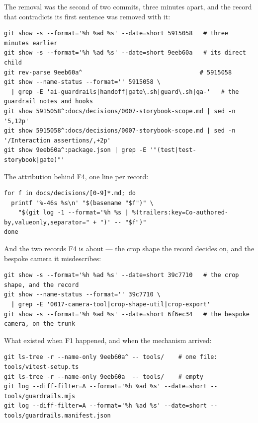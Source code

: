 \documentclass[11pt,a4paper]{article}
\begin{document}
The removal was the second of two commits, three minutes apart, and the record that contradicts its first sentence was removed with it:

\begin{Verbatim}[fontsize=\footnotesize,breaklines=true,breakanywhere=true]
git show -s --format='%h %ad %s' --date=short 5915058   # three minutes earlier
git show -s --format='%h %ad %s' --date=short 9eeb60a   # its direct child
git rev-parse 9eeb60a^                                 # 5915058
git show --name-status --format='' 5915058 \
  | grep -E 'ai-guardrails|handoff|gate\.sh|guard\.sh|qa-'   # the guardrail notes and hooks
git show 5915058^:docs/decisions/0007-storybook-scope.md | sed -n '5,12p'
git show 5915058^:docs/decisions/0007-storybook-scope.md | sed -n '/Interaction assertions/,+2p'
git show 9eeb60a^:package.json | grep -E '"(test|test-storybook|gate)"'
\end{Verbatim}

The attribution behind F4, one line per record:

\begin{Verbatim}[fontsize=\footnotesize,breaklines=true,breakanywhere=true]
for f in docs/decisions/[0-9]*.md; do
  printf '%-46s %s\n' "$(basename "$f")" \
    "$(git log -1 --format='%h %s | %(trailers:key=Co-authored-by,valueonly,separator=" + ")' -- "$f")"
done
\end{Verbatim}

And the two records F4 is about --- the crop shape the record decides on, and the bespoke camera it misdescribes:

\begin{Verbatim}[fontsize=\footnotesize,breaklines=true,breakanywhere=true]
git show -s --format='%h %ad %s' --date=short 39c7710   # the crop shape, and the record
git show --name-status --format='' 39c7710 \
  | grep -E '0017-camera-tool|crop-shape-util|crop-export'
git show -s --format='%h %ad %s' --date=short 6f6ec34   # the bespoke camera, on the trunk
\end{Verbatim}

What existed when F1 happened, and when the mechanism arrived:

\begin{Verbatim}[fontsize=\footnotesize,breaklines=true,breakanywhere=true]
git ls-tree -r --name-only 9eeb60a^ -- tools/    # one file: tools/vitest-setup.ts
git ls-tree -r --name-only 9eeb60a  -- tools/    # empty
git log --diff-filter=A --format='%h %ad %s' --date=short -- tools/guardrails.mjs
git log --diff-filter=A --format='%h %ad %s' --date=short -- tools/guardrails.manifest.json
\end{Verbatim}
\end{document}
